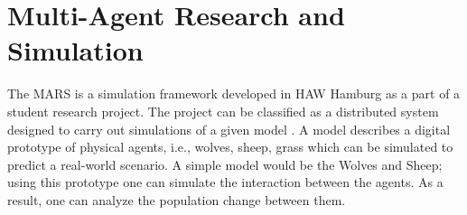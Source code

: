 
\section{Multi-Agent Research and Simulation}
        \label{section:MARS}
        The MARS is a simulation framework developed 
        in HAW Hamburg as a part of a student research project. The project can be classified as a
        distributed system \cite{DistributedSystems} designed to carry out simulations of a given model 
        \cite{HAWHamburgMARS}. 
        A model describes a digital prototype of physical agents, i.e., wolves, sheep, grass 
        which can be simulated to predict a real-world scenario. A simple model would
        be the Wolves and Sheep; using this prototype one can simulate the interaction between the agents. 
        As a result, one can analyze the population change between them.

        \par
